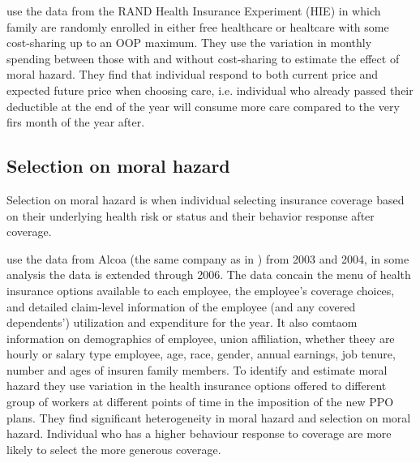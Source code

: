\documentclass{article}
\newcommand{\bib}{references.bib}
\begin{document}
\cite{brot2017does} use the data from the RAND Health Insurance Experiment (HIE) in which family are randomly enrolled in either free healthcare or healtcare with some cost-sharing up to an OOP maximum. They use the variation in monthly spending between those with and without cost-sharing to estimate the effect of moral hazard. They find that individual respond to both current price and expected future price when choosing care, i.e. individual who already passed their deductible at the end of the year will consume more care compared to the very firs month of the year after.

\subsection*{Selection on moral hazard}
Selection on moral hazard is when individual selecting insurance coverage based on their underlying health risk or status and their behavior response after coverage.

\cite{einav2013selection} use the data from Alcoa (the same company as in \cite{einav2010estimating}) from 2003 and 2004, in some analysis the data is extended through 2006. The data concain the menu of health insurance options available to each employee, the employee's coverage choices, and detailed claim-level information of the employee (and any covered dependents') utilization and expenditure for the year. It also comtaom information on demographics of employee, union affiliation, whether theey are hourly or salary type employee, age, race, gender, annual earnings, job tenure, number and ages of insuren family members. To identify and estimate moral hazard they use variation in the health insurance options offered to different group of workers at different points of time in the imposition of the new PPO plans. They find significant heterogeneity in moral hazard and selection on moral hazard. Individual who has a higher behaviour response to coverage are more likely to select the more generous coverage.


\end{document}
